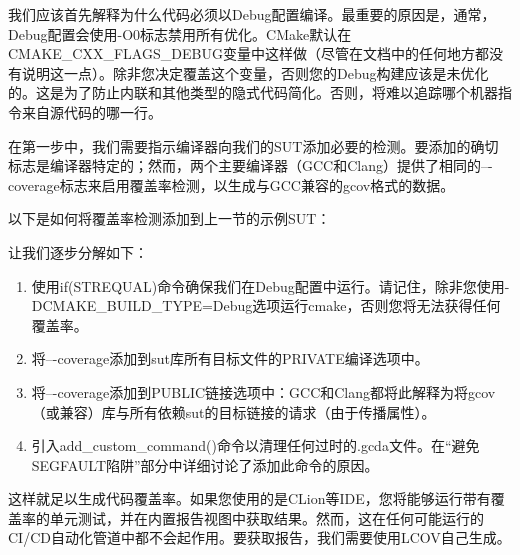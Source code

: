 我们应该首先解释为什么代码必须以Debug配置编译。最重要的原因是，通常，Debug配置会使用-O0标志禁用所有优化。CMake默认在CMAKE\_CXX\_FLAGS\_DEBUG变量中这样做（尽管在文档中的任何地方都没有说明这一点）。除非您决定覆盖这个变量，否则您的Debug构建应该是未优化的。这是为了防止内联和其他类型的隐式代码简化。否则，将难以追踪哪个机器指令来自源代码的哪一行。

在第一步中，我们需要指示编译器向我们的SUT添加必要的检测。要添加的确切标志是编译器特定的；然而，两个主要编译器（GCC和Clang）提供了相同的–{}-coverage标志来启用覆盖率检测，以生成与GCC兼容的gcov格式的数据。

以下是如何将覆盖率检测添加到上一节的示例SUT：



让我们逐步分解如下：

\begin{enumerate}
\item
使用if(STREQUAL)命令确保我们在Debug配置中运行。请记住，除非您使用-DCMAKE\_BUILD\_TYPE=Debug选项运行cmake，否则您将无法获得任何覆盖率。

\item
将–{}-coverage添加到sut库所有目标文件的PRIVATE编译选项中。

\item
将–{}-coverage添加到PUBLIC链接选项中：GCC和Clang都将此解释为将gcov（或兼容）库与所有依赖sut的目标链接的请求（由于传播属性）。

\item
引入add\_custom\_command()命令以清理任何过时的.gcda文件。在“避免SEGFAULT陷阱”部分中详细讨论了添加此命令的原因。
\end{enumerate}

这样就足以生成代码覆盖率。如果您使用的是CLion等IDE，您将能够运行带有覆盖率的单元测试，并在内置报告视图中获取结果。然而，这在任何可能运行的CI/CD自动化管道中都不会起作用。要获取报告，我们需要使用LCOV自己生成。

